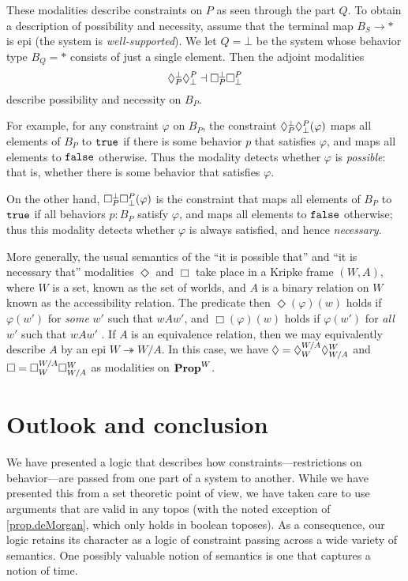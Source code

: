 These modalities describe constraints on $P$ as seen through the part $Q$. To obtain a description of possibility and necessity, assume that the terminal map $B_S\to\ast$ is epi (the system is \emph{well-supported}). We let $Q=\bot$ be the system whose behavior type $B_Q=\ast$ consists of just a single element. Then the adjoint modalities
$$\compat{\bot}{P}\compat{P}{\bot} \dashv \ensure{\bot}{P}\ensure{P}{\bot}$$
describe possibility and necessity on $B_P$. 

For example, for any constraint $\varphi$ on $B_P$, the constraint $\compat{\bot}{P}\compat{P}{\bot}(\varphi)$ maps all elements of $B_P$ to $\true$ if there is some behavior $p$ that satisfies $\varphi$, and maps all elements to $\false$ otherwise. Thus the modality detects whether $\varphi$ is \emph{possible}: that is, whether there is some behavior that satisfies $\varphi$. 

On the other hand, $\ensure{\bot}{P}\ensure{P}{\bot}(\varphi)$ is the constraint that maps all elements of $B_P$ to $\true$ if all behaviors $p : B_P$ satisfy $\varphi$, and maps all elements to $\false$ otherwise; thus this modality detects whether $\varphi$ is always satisfied, and hence \emph{necessary}.

More generally, the usual semantics of the ``it is possible that'' and ``it is necessary that'' modalities $\Diamond$ and $\Box$ take place in a Kripke frame $(W,A)$, where $W$ is a set, known as the set of worlds, and $A$ is a binary relation on $W$ known as the accessibility relation. The predicate then $\Diamond(\varphi)(w)$ holds if $\varphi(w')$ for \emph{some} $w'$ such that $wAw'$, and $\Box(\varphi)(w)$ holds if $\varphi(w')$ for \emph{all} $w'$ such that $wAw'$ \cite{kripke1963semantical}. If $A$ is an equivalence relation, then we may equivalently describe $A$ by an epi $W \twoheadrightarrow W/A$. In this case, we have $\Diamond=\compat{W/A}{W}\compat{W}{W/A}$ and $\Box= \ensure{W/A}{W}\ensure{W}{W/A}$ as modalities on $\Prop^W$. 

\section{Outlook and conclusion}
We have presented a logic that describes how constraints---restrictions on behavior---are passed from one part of a system to another. While we have presented this from a set theoretic point of view, we have taken care to use arguments that are valid in any topos (with the noted exception of \cref{prop.deMorgan}, which only holds in boolean toposes). As a consequence, our logic retains its character as a logic of constraint passing across a wide variety of semantics. One possibly valuable notion of semantics is one that captures a notion of time.

